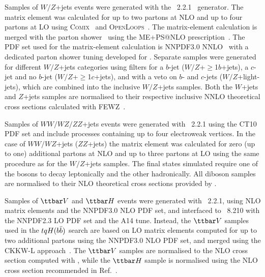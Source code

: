 Samples of $W/Z$+jets events were generated with the {\sherpa}~2.2.1~\cite{Gleisberg:2008ta} generator. 
The matrix element was calculated for up to two partons at NLO and up to four partons at LO using 
\textsc{Comix}~\cite{Gleisberg:2008fv} and \textsc{OpenLoops}~\cite{Cascioli:2011va}. The matrix-element calculation 
is merged with the {\sherpa} parton shower~\cite{Schumann:2007mg} using the ME+PS@NLO prescription~\cite{Hoeche:2012yf}. 
The PDF set used for the matrix-element calculation is NNPDF3.0 NNLO~\cite{Ball:2014uwa} with a dedicated parton shower tuning developed for {\sherpa}. 
Separate samples were generated for different $W/Z$+jets categories using filters for a $b$-jet 
($W/Z$+$\geq$1$b$+jets), a $c$-jet and no $b$-jet ($W/Z$+$\geq$1$c$+jets), and with a veto on $b$- and $c$-jets 
($W/Z$+light-jets), which are combined into the inclusive $W/Z$+jets samples.
Both the $W$+jets and $Z$+jets samples are normalised to their respective inclusive NNLO theoretical 
cross sections calculated with \textsc{FEWZ}~\cite{Anastasiou:2003ds}.

Samples of $WW/WZ/ZZ$+jets events were generated with {\sherpa}~2.2.1 using the CT10 PDF set
and include processes containing up to four electroweak vertices. 
In the case of $WW/WZ$+jets ($ZZ$+jets) the matrix element was calculated for zero (up to one) additional partons 
at NLO and up to three partons at LO using the same procedure as for the $W/Z$+jets samples. 
The final states simulated require one of the bosons to decay leptonically and the other hadronically.
All diboson samples are normalised to their NLO theoretical cross sections provided by {\sherpa}. 

Samples of $\ttbar V$ and $\ttbar H$ events were generated with {\amcatnlo}~2.2.1, using NLO matrix elements and the NNPDF3.0 NLO PDF set,
and interfaced to {\pythia}~8.210 with the NNPDF2.3 LO PDF set and the A14 tune. 
Instead, the $\ttbar V$ samples used in the $tqH(b\bar{b})$ search are based on LO matrix elements computed for up to two additional partons 
using the NNPDF3.0 NLO PDF set, and merged using the CKKW-L approach~\cite{Lonnblad:2001iq}.
The $\ttbar V$ samples are normalised to the NLO cross section computed with {\amcatnlo}, while the $\ttbar H$ sample is normalised using 
the NLO cross section recommended in Ref.~\cite{deFlorian:2016spz}.


